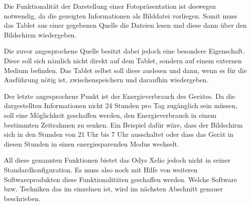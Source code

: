 \begin{flushleft}
Die Funktionalität der Darstellung einer Fotopräsentation ist deswegen notwendig, da die gezeigten Informationen als Bilddatei vorliegen. Somit muss das Tablet aus einer gegebenen Quelle die Dateien lesen und diese dann über den Bildschirm wiedergeben.

Die zuvor angesprochene Quelle besitzt dabei jedoch eine besondere Eigenschaft. Diese soll sich nämlich nicht direkt auf dem Tablet, sondern      
auf einem externen Medium befinden. Das Tablet selbst soll diese auslesen und dann, wenn es für die Ausführung nötig ist, zwischenspeichern und daraufhin wiedergeben.

Der letzte angesprochene Punkt ist der Energieverbrauch des Gerätes. Da die dargestellten Informationen nicht 24 Stunden pro Tag zugänglich sein müssen, soll eine Möglichkeit geschaffen werden, den Energieverbrauch in einem bestimmten Zeitrahmen zu senken. Ein Beispiel dafür wäre, dass der Bildschirm sich in den Stunden von 21 Uhr bis 7 Uhr ausschaltet oder dass das Gerät in diesen Stunden in einen energiesparenden Modus wechselt. 

All diese genannten Funktionen bietet das Odys Xelio jedoch nicht in seiner Standardkonfiguration. Es muss also noch mit Hilfe von weiteren Softwareprodukten diese Funktionalitäten geschaffen werden. Welche Software bzw. Techniken das im einzelnen ist, wird im nächsten Abschnitt genauer beschrieben. 
\end{flushleft}

% 

